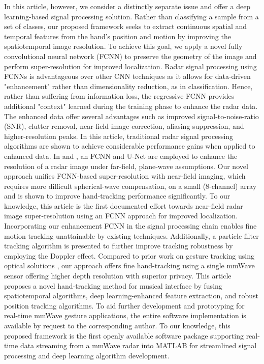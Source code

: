 \documentclass[10pt,journal,final]{IEEEtran}
\begin{document}
In this article, however, we consider a distinctly separate issue and offer a deep learning-based signal processing solution.
Rather than classifying a sample from a set of classes, our proposed framework seeks to extract continuous spatial and temporal features from the hand's position and motion by improving the spatiotemporal image resolution.
To achieve this goal, we apply a novel fully convolutional neural network (FCNN) to preserve the geometry of the image and perform super-resolution for improved localization.
Radar signal processing using FCNNs is advantageous over other CNN techniques as it allows for data-driven "enhancement" rather than dimensionality reduction, as in classification.
Hence, rather than suffering from information loss, the regressive FCNN provides additional "context" learned during the training phase to enhance the radar data.
The enhanced data offer several advantages such as improved signal-to-noise-ratio (SNR), clutter removal, near-field image correction, aliasing suppression, and higher-resolution peaks.
In this article, traditional radar signal processing algorithms are shown to achieve considerable performance gains when applied to enhanced data.
In \cite{gao2018enhanced} and \cite{kim2020aziumth}, an FCNN and U-Net are employed to enhance the resolution of a radar image under far-field, plane-wave assumptions.
Our novel approach unifies FCNN-based super-resolution with near-field imaging, which requires more difficult spherical-wave compensation, on a small (8-channel) array and is shown to improve hand-tracking performance significantly.
To our knowledge, this article is the first documented effort towards near-field radar image super-resolution using an FCNN approach for improved localization.
Incorporating our enhancement FCNN in the signal processing chain enables fine motion tracking unattainable by existing techniques.
Additionally, a particle filter tracking algorithm is presented to further improve tracking robustness by employing the Doppler effect. 
Compared to prior work on gesture tracking using optical solutions \cite{sun2019visual,polfreman2011multi,jensenius2013kinectofon,han2014lessons,hantrakul2014implementations,nieto2013hand}, our approach offers fine hand-tracking using a single mmWave sensor offering higher depth resolution with superior privacy. 
This article proposes a novel hand-tracking method for musical interface by fusing spatiotemporal algorithms, deep learning-enhanced feature extraction, and robust position tracking algorithms. 
To aid further development and prototyping for real-time mmWave gesture applications, the entire software implementation is available by request to the corresponding author. 
To our knowledge, this proposed framework is the first openly available software package supporting real-time data streaming from a mmWave radar into MATLAB for streamlined signal processing and deep learning algorithm development. 
\end{document}
